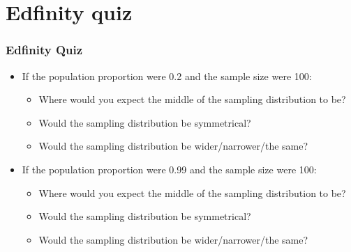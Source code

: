 \documentclass[t,compress,mathserif]{beamer}
\begin{document}


\section{Edfinity quiz}


\begin{frame}
    \frametitle{Edfinity Quiz}

    \begin{itemize}

        \item If the population proportion were 0.2 and the sample size were 100:
        \begin{itemize}
            \item Where would you expect the middle of the sampling distribution to be?
            \item Would the sampling distribution be symmetrical?
            \item Would the sampling distribution be wider/narrower/the same?
        \end{itemize}
        \item If the population proportion were 0.99 and the sample size were 100:
        \begin{itemize}
            \item Where would you expect the middle of the sampling distribution to be?
            \item Would the sampling distribution be symmetrical?
            \item Would the sampling distribution be wider/narrower/the same?
        \end{itemize}
 
    \end{itemize}

\end{frame}
\end{document}
